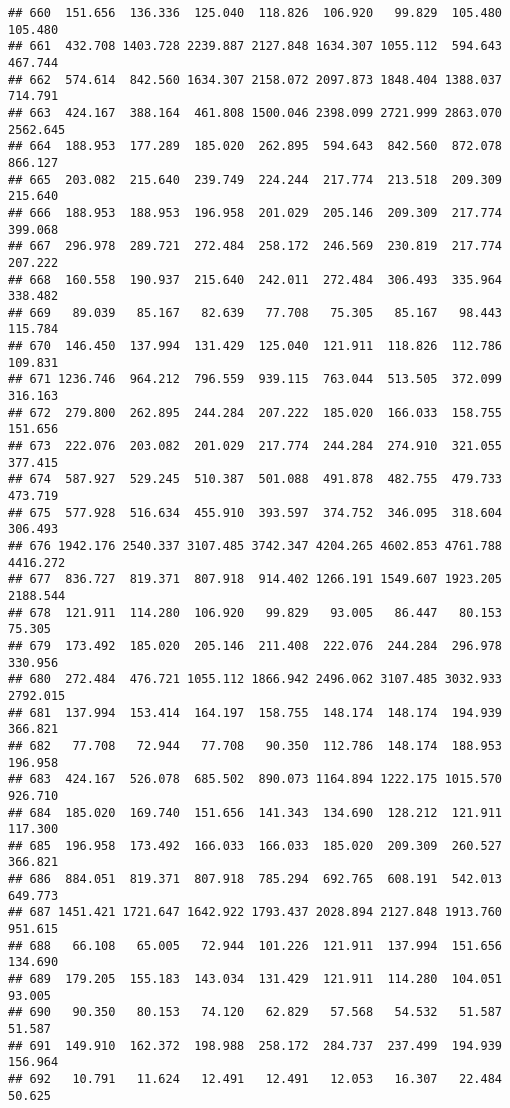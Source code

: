 \documentclass[
]{article}
\begin{document}
\begin{verbatim}
## 660  151.656  136.336  125.040  118.826  106.920   99.829  105.480  105.480
## 661  432.708 1403.728 2239.887 2127.848 1634.307 1055.112  594.643  467.744
## 662  574.614  842.560 1634.307 2158.072 2097.873 1848.404 1388.037  714.791
## 663  424.167  388.164  461.808 1500.046 2398.099 2721.999 2863.070 2562.645
## 664  188.953  177.289  185.020  262.895  594.643  842.560  872.078  866.127
## 665  203.082  215.640  239.749  224.244  217.774  213.518  209.309  215.640
## 666  188.953  188.953  196.958  201.029  205.146  209.309  217.774  399.068
## 667  296.978  289.721  272.484  258.172  246.569  230.819  217.774  207.222
## 668  160.558  190.937  215.640  242.011  272.484  306.493  335.964  338.482
## 669   89.039   85.167   82.639   77.708   75.305   85.167   98.443  115.784
## 670  146.450  137.994  131.429  125.040  121.911  118.826  112.786  109.831
## 671 1236.746  964.212  796.559  939.115  763.044  513.505  372.099  316.163
## 672  279.800  262.895  244.284  207.222  185.020  166.033  158.755  151.656
## 673  222.076  203.082  201.029  217.774  244.284  274.910  321.055  377.415
## 674  587.927  529.245  510.387  501.088  491.878  482.755  479.733  473.719
## 675  577.928  516.634  455.910  393.597  374.752  346.095  318.604  306.493
## 676 1942.176 2540.337 3107.485 3742.347 4204.265 4602.853 4761.788 4416.272
## 677  836.727  819.371  807.918  914.402 1266.191 1549.607 1923.205 2188.544
## 678  121.911  114.280  106.920   99.829   93.005   86.447   80.153   75.305
## 679  173.492  185.020  205.146  211.408  222.076  244.284  296.978  330.956
## 680  272.484  476.721 1055.112 1866.942 2496.062 3107.485 3032.933 2792.015
## 681  137.994  153.414  164.197  158.755  148.174  148.174  194.939  366.821
## 682   77.708   72.944   77.708   90.350  112.786  148.174  188.953  196.958
## 683  424.167  526.078  685.502  890.073 1164.894 1222.175 1015.570  926.710
## 684  185.020  169.740  151.656  141.343  134.690  128.212  121.911  117.300
## 685  196.958  173.492  166.033  166.033  185.020  209.309  260.527  366.821
## 686  884.051  819.371  807.918  785.294  692.765  608.191  542.013  649.773
## 687 1451.421 1721.647 1642.922 1793.437 2028.894 2127.848 1913.760  951.615
## 688   66.108   65.005   72.944  101.226  121.911  137.994  151.656  134.690
## 689  179.205  155.183  143.034  131.429  121.911  114.280  104.051   93.005
## 690   90.350   80.153   74.120   62.829   57.568   54.532   51.587   51.587
## 691  149.910  162.372  198.988  258.172  284.737  237.499  194.939  156.964
## 692   10.791   11.624   12.491   12.491   12.053   16.307   22.484   50.625

\end{verbatim}
\end{document}
